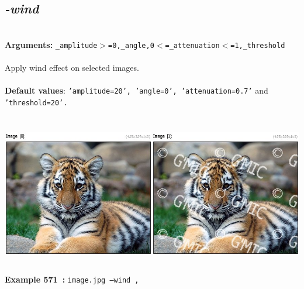 \documentclass[a4paper,11pt,twoside]{book}
\begin{document}
\subsection{\emph{-wind} }\vspace*{-0.5em}
~\\\textbf{Arguments: } 
{\small \texttt{\_amplitude$>$=0,\_angle,0$<$=\_attenuation$<$=1,\_threshold}}\\~\\
Apply wind effect on selected images.
~\\~\\\textbf{Default values}: {\small \texttt{'amplitude=20', 'angle=0', 'attenuation=0.7'} and \texttt{'threshold=20'.}}
\begin{center}\includegraphics[keepaspectratio=true,height=7cm,width=\textwidth]{img/gmic_def571.jpg}\\
{\footnotesize \textbf{Example 571~:} \texttt{image.jpg --wind ,}}
\end{center}
\end{document}
